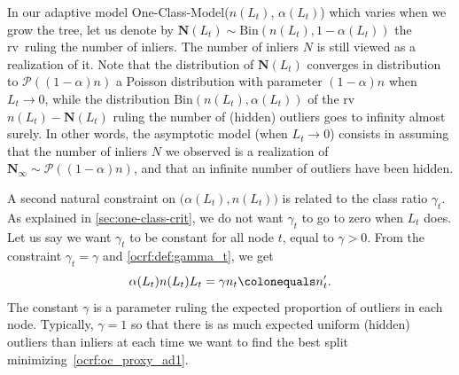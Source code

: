 \begin{remark}
    In our adaptive model One-Class-Model($n(L_t)$, $\alpha(L_t)$) which varies
    when we grow the tree, let us denote by $\mathbf{N}(L_t) \sim
    \text{Bin}\left(n(L_t), 1-\alpha(L_t)\right)$ the \acs{rv}~ruling the
    number of inliers. The number of inliers $N$ is still viewed as a
    realization of it.  Note that the distribution of $\mathbf{N}(L_t)$
    converges in distribution to $\mathcal{P}\left((1-\alpha)n\right)$ a
    Poisson distribution with parameter $(1-\alpha) n$ when $L_t \to 0$, while
    the distribution $\text{Bin}\left(n(L_t), \alpha(L_t)\right)$ of the
    \acs{rv}~$n(L_t) - \mathbf{N}(L_t)$ ruling the number of (hidden) outliers
    goes to infinity almost surely. In other words, the asymptotic model (when
    $L_t \to 0$) consists in assuming that the number of inliers $N$ we
    observed is a realization of $\mathbf{N}_\infty \sim
    \mathcal{P}\left((1-\alpha)n\right)$, and that an infinite number of
    outliers have been hidden.
\end{remark}
A second natural constraint on $\big(\alpha(L_t), n(L_t)\big)$ is related to
the class ratio $\gamma_t$.
As explained in \cref{sec:one-class-crit}, we do not want $\gamma_t$ to go to
zero when $L_t$ does.  Let us say we want $\gamma_t$ to be constant for all
node $t$, equal to $\gamma>0$. From the constraint $\gamma_t = \gamma$ and
\cref{ocrf:def:gamma_t}, we get
\begin{dmath}
    \label{ocrf:constraint2}
    \alpha(L_t) n(L_t) L_t
    = \gamma n_t \colonequals n_t'.
\end{dmath}
The constant $\gamma$ is a parameter ruling the expected proportion of outliers
in each node. Typically, $\gamma=1$ so that there is as much expected uniform
(hidden) outliers than inliers at each time we want to find the best split
minimizing~\cref{ocrf:oc_proxy_ad1}.
